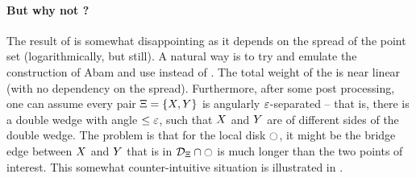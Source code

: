 \documentclass[12pt]{article}%
\begin{document}
\paragraph{But why not \SSPD?}

The result of  is somewhat disappointing as it depends
on the spread of the point set (logarithmically, but still). A natural
way is to try and emulate the construction of Abam \etal
\cite{abfg-rftgs-09} and use \SSPD instead of \WSPD. The total weight
of the \SSPD is near linear (with no dependency on the
spread). Furthermore, after some post processing, one can assume every
pair $\Xi = \{ X, Y \}$ is angularly $\varepsilon$-separated -- that
is, there is a double wedge with angle $\leq \varepsilon$, such that $X$
and $Y$ are of different sides of the double wedge. The problem is
that for the local disk $\ocircle$, it might be the bridge edge between
$X$ and $Y$ that is in $\mathcal{D}_\Xi \cap \ocircle$ is much longer
than the two points of interest. This somewhat counter-intuitive
situation is illustrated in .
\end{document}
